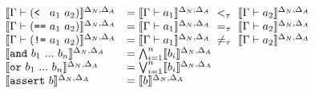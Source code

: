\begin{equation*}
\begin{array}{llll}
    \\
    \semenv{\Gamma\vdash(\text{\texttt{< }}~a_1~a_2)} 
    &= \semenv{\Gamma\vdash{a_1}}~<_\tau~\semenv{\Gamma\vdash{a_2}} 
    \\
    \semenv{\Gamma\vdash(\text{\texttt{==}}~a_1~a_2)} 
    &= \semenv{\Gamma\vdash{a_1}}~=_\tau~\semenv{\Gamma\vdash{a_2}} 
    \\
    \semenv{\Gamma\vdash(\text{\texttt{!=}}~a_1~a_2)} 
    &= \semenv{\Gamma\vdash{a_1}}~\neq_\tau~\semenv{\Gamma\vdash{a_2}}
    \\
    \semenv{\text{\texttt{and}}~b_1~...~b_n} &=\bigwedge^{n}_{i=1}\semenv{b_i}\\
    \semenv{\text{\texttt{or}}~b_1~...~b_n} &=\bigvee^{n}_{i=1}\semenv{b_i}\\
    \semenv{\text{\texttt{assert}}~b} &= \semenv{b}
\end{array}
\end{equation*}